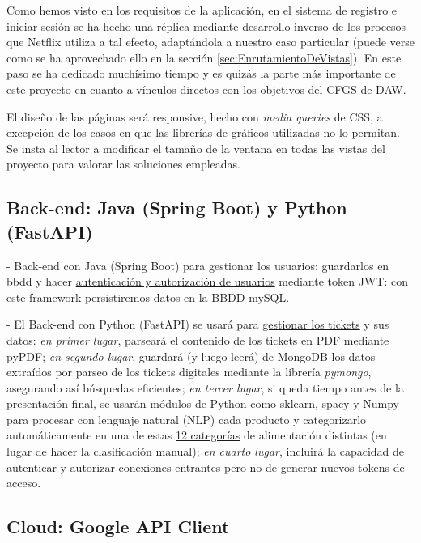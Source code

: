 \documentclass[a4paper,12pt]{report}
\begin{document}
			Como hemos visto en los requisitos de la aplicación, en el sistema de registro e iniciar sesión se ha hecho una réplica mediante desarrollo inverso de los procesos que Netflix utiliza a tal efecto, adaptándola a nuestro caso particular (puede verse como se ha aprovechado ello en la sección \ref{sec:EnrutamientoDeVistas}). En este paso se ha dedicado muchísimo tiempo y es quizás la parte más importante de este proyecto en cuanto a vínculos directos con los objetivos del CFGS de DAW.
			
			El diseño de las páginas será responsive, hecho con \textit{media queries} de CSS, a excepción de los casos en que las librerías de gráficos utilizadas no lo permitan. Se insta al lector a modificar el tamaño de la ventana en todas las vistas del proyecto para valorar las soluciones empleadas.
			
	
		 
		\subsection{Back-end: Java (Spring Boot) y Python (FastAPI)}
		
			- Back-end con Java (Spring Boot) para gestionar los usuarios: guardarlos en bbdd y hacer \underline{autenticación y autorización de usuarios} mediante token JWT: con este framework persistiremos datos en la BBDD mySQL.
			
			- El Back-end con Python (FastAPI) se usará para \underline{gestionar los tickets} y sus datos: \textit{en primer lugar}, parseará el contenido de los tickets en PDF mediante pyPDF; \textit{en segundo lugar}, guardará (y luego leerá) de MongoDB los datos extraídos por parseo de los tickets digitales mediante la librería \textit{pymongo}, asegurando así búsquedas eficientes; \textit{en tercer lugar}, si queda tiempo antes de la presentación final, se usarán módulos de Python como sklearn, spacy y Numpy para procesar con lenguaje natural (NLP) cada producto y categorizarlo automáticamente en una de estas \href{https://github.com/blackcub3s/mercApp/blob/main/APP%20WEB/__frontend__produccio__/app/js/dashboard/categories.js}{12 categorías} de alimentación distintas (en lugar de hacer la clasificación manual); \textit{en cuarto lugar}, incluirá la capacidad de autenticar y autorizar conexiones entrantes pero no de generar nuevos tokens de acceso.
			
		
		\subsection{Cloud: Google API Client}
		
\end{document}
